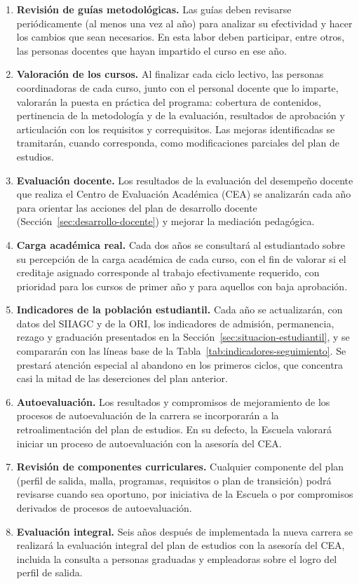 \begin{enumerate}
    \item \textbf{Revisión de guías metodológicas.} Las guías deben revisarse periódicamente (al menos una vez al año) para analizar su efectividad y hacer los cambios que sean necesarios. En esta labor deben participar, entre otros, las personas docentes que hayan impartido el curso en ese año.
    \item \textbf{Valoración de los cursos.} Al finalizar cada ciclo lectivo, las personas coordinadoras de cada curso, junto con el personal docente que lo imparte, valorarán la puesta en práctica del programa: cobertura de contenidos, pertinencia de la metodología y de la evaluación, resultados de aprobación y articulación con los requisitos y correquisitos. Las mejoras identificadas se tramitarán, cuando corresponda, como modificaciones parciales del plan de estudios.
    \item \textbf{Evaluación docente.} Los resultados de la evaluación del desempeño docente que realiza el Centro de Evaluación Académica (CEA) se analizarán cada año para orientar las acciones del plan de desarrollo docente (Sección~\ref{sec:desarrollo-docente}) y mejorar la mediación pedagógica.
    \item \textbf{Carga académica real.} Cada dos años se consultará al estudiantado sobre su percepción de la carga académica de cada curso, con el fin de valorar si el creditaje asignado corresponde al trabajo efectivamente requerido, con prioridad para los cursos de primer año y para aquellos con baja aprobación.
    \item \textbf{Indicadores de la población estudiantil.} Cada año se actualizarán, con datos del SIIAGC y de la ORI, los indicadores de admisión, permanencia, rezago y graduación presentados en la Sección~\ref{sec:situacion-estudiantil}, y se compararán con las líneas base de la Tabla~\ref{tab:indicadores-seguimiento}. Se prestará atención especial al abandono en los primeros ciclos, que concentra casi la mitad de las deserciones del plan anterior.
    \item \textbf{Autoevaluación.} Los resultados y compromisos de mejoramiento de los procesos de autoevaluación de la carrera se incorporarán a la retroalimentación del plan de estudios. En su defecto, la Escuela valorará iniciar un proceso de autoevaluación con la asesoría del CEA.
    \item \textbf{Revisión de componentes curriculares.} Cualquier componente del plan (perfil de salida, malla, programas, requisitos o plan de transición) podrá revisarse cuando sea oportuno, por iniciativa de la Escuela o por compromisos derivados de procesos de autoevaluación.
    \item \textbf{Evaluación integral.} Seis años después de implementada la nueva carrera se realizará la evaluación integral del plan de estudios con la asesoría del CEA, incluida la consulta a personas graduadas y empleadoras sobre el logro del perfil de salida.
\end{enumerate}

